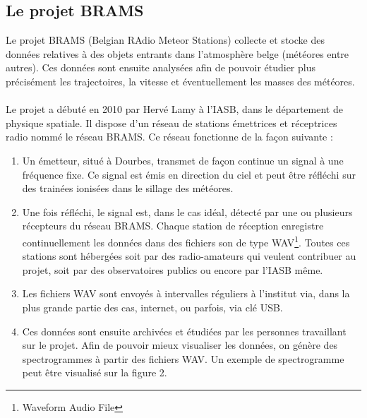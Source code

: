 \documentclass[11pt]{article}
\begin{document}
\subsection{Le projet BRAMS}
Le projet BRAMS (Belgian RAdio Meteor Stations) collecte et stocke des données relatives à des objets entrants dans l'atmosphère belge (météores entre autres).
Ces données sont ensuite analysées afin de pouvoir étudier plus précisément les trajectoires, la vitesse et éventuellement les masses des météores.\\
\\
Le projet a débuté en 2010 par Hervé Lamy à l'IASB, dans le département de physique spatiale.
Il dispose d'un réseau de stations émettrices et réceptrices radio nommé le réseau BRAMS.
Ce réseau fonctionne de la façon suivante :
\begin{enumerate}
    \item Un émetteur, situé à Dourbes, transmet de façon continue un signal à une fréquence fixe.
          Ce signal est émis en direction du ciel et peut être réfléchi sur des trainées ionisées dans le sillage des météores.
    \item Une fois réfléchi, le signal est, dans le cas idéal, détecté par une ou plusieurs récepteurs du réseau BRAMS.
          Chaque station de réception enregistre continuellement les données dans des fichiers son de type WAV\footnote{Waveform Audio File}.
          Toutes ces stations sont hébergées soit par des radio-amateurs qui veulent contribuer au projet, soit par des observatoires publics ou encore par l'IASB même.
    \item Les fichiers WAV sont envoyés à intervalles réguliers à l'institut via, dans la plus grande partie des cas, internet, ou parfois, via clé USB.
    \item Ces données sont ensuite archivées et étudiées par les personnes travaillant sur le projet.
          Afin de pouvoir mieux visualiser les données, on génère des spectrogrammes à partir des fichiers WAV.
          Un exemple de spectrogramme peut être visualisé sur la figure 2.
\end{enumerate}
\end{document}
